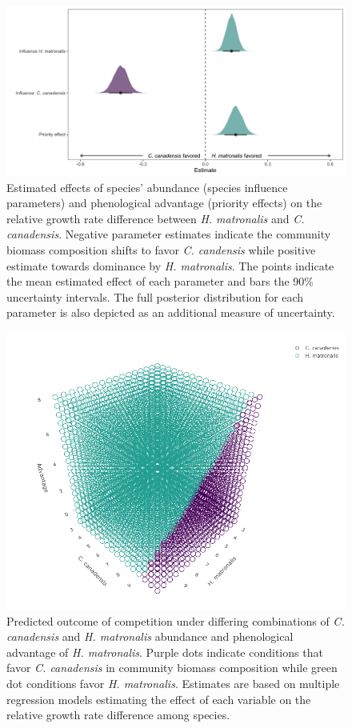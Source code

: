 \documentclass{article}[11pt]
\begin{document}
\begin{figure}[h!]
    \centering
\includegraphics[width=\textwidth]{..//figure/mu_plots.jpeg}
    \caption{Estimated effects of species' abundance (species influence parameters) and phenological advantage (priority effects) on the relative growth rate difference between \textit{H. matronalis} and \textit{C. canadensis}. Negative parameter estimates indicate the community biomass composition shifts to favor \textit{C. candensis} while positive estimate towards dominance by \textit{ H. matronalis}. The points indicate the mean estimated effect of each parameter and bars the 90\% uncertainty intervals. The full posterior distribution for each parameter is also depicted as an additional measure of uncertainty.} 
    \label{fig:RGRD}
\end{figure}

\begin{figure}[h!]
    \centering
\includegraphics[width=\textwidth]{..//figure/3dconnolly2.png}
   \caption{Predicted outcome of competition under differing combinations of \textit{C. canadensis} and \textit{H. matronalis} abundance and phenological advantage of \textit{H. matronalis}. Purple dots indicate conditions that favor  \textit{C. canadensis} in community biomass composition while green dot conditions favor \textit{H. matronalis}. Estimates are based on multiple regression models estimating the effect of each variable on the relative growth rate difference among species.} 
   \label{fig:3D}
\end{figure}
\end{document}
